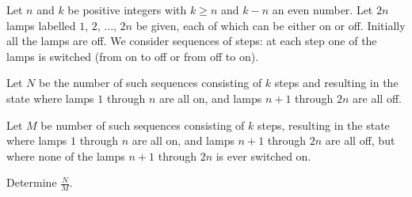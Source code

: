 Let $ n$ and $ k$ be positive integers with $ k \geq n$ and $ k - n$ an even number. Let $ 2n$ lamps labelled $ 1$,  $ 2$,  ..., $ 2n$ be given, each of which can be either on or off. Initially all the lamps are off. We consider sequences of steps: at each step one of the lamps is switched (from on to off or from off to on).

Let $ N$ be the number of such sequences consisting of $ k$ steps and resulting in the state where lamps $ 1$ through $ n$ are all on, and lamps $ n + 1$ through $ 2n$ are all off.

Let $ M$ be number of such sequences consisting of $ k$ steps, resulting in the state where lamps $ 1$ through $ n$ are all on, and lamps $ n + 1$ through $ 2n$ are all off, but where none of the lamps $ n + 1$ through $ 2n$ is ever switched on.

Determine $ \frac {N}{M}$.